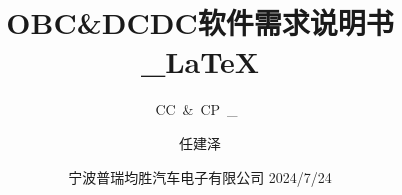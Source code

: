 
\subtitle{CC~\&~CP~\_~\XeLaTeX}
\title{OBC\&DCDC软件需求说明书\_\LaTeX }
\author{任建泽}
\date{宁波普瑞均胜汽车电子有限公司 2024/7/24}









\maketitle
\frontmatter
\tableofcontents
 \mainmatter

\clearpage
{} %
\setcounter{page}{1} %

